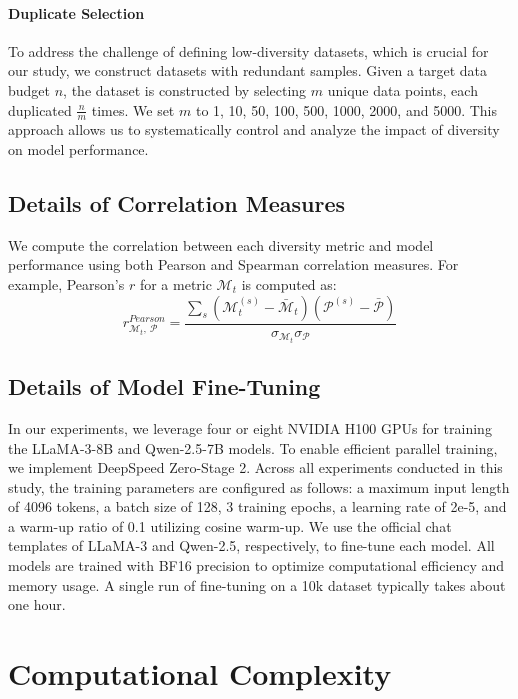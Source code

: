 \paragraph{Duplicate Selection} To address the challenge of defining low-diversity datasets, which is crucial for our study, we construct datasets with redundant samples. Given a target data budget $n$, the dataset is constructed by selecting $m$ unique data points, each duplicated $\frac{n}{m}$ times. We set $m$ to 1, 10, 50, 100, 500, 1000, 2000, and 5000. This approach allows us to systematically control and analyze the impact of diversity on model performance.

\subsection{Details of Correlation Measures}
\label{app:corr}

We compute the correlation between each diversity metric and model performance using both Pearson \cite{cohen2009pearson} and Spearman \cite{zar2005spearman} correlation measures.
For example, Pearson's $r$ for a metric $\mathcal{M}_{t}$ is computed as:
\begin{equation}
    r_{\mathcal{M}_{t},\ \mathcal{P}}^{Pearson} = \frac{
        \sum_{s} (\mathcal{M}_{t}^{(s)} - \bar{\mathcal{M}}_t) (\mathcal{P}^{(s)} - \bar{\mathcal{P}})
    }{
        \sigma_{\mathcal{M}_t} \sigma_{\mathcal{P}}
    }
\end{equation}


\subsection{Details of Model Fine-Tuning}
\label{app:ft}
In our experiments, we leverage four or eight NVIDIA H100 GPUs for training the LLaMA-3-8B and Qwen-2.5-7B models. To enable efficient parallel training, we implement DeepSpeed Zero-Stage 2. Across all experiments conducted in this study, the training parameters are configured as follows: a maximum input length of 4096 tokens, a batch size of 128, 3 training epochs, a learning rate of 2e-5, and a warm-up ratio of 0.1 utilizing cosine warm-up. We use the official chat templates of LLaMA-3 and Qwen-2.5, respectively, to fine-tune each model. All models are trained with BF16 precision to optimize computational efficiency and memory usage. A single run of fine-tuning on a 10k dataset typically takes about one hour.

\section{Computational Complexity}
\label{app:complexity}

